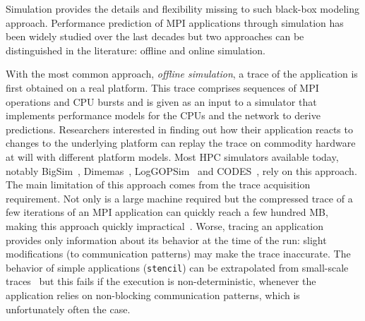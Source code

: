        Simulation provides the details and flexibility missing to such black-box modeling approach. Performance
        prediction of MPI applications through simulation has been widely studied over the last decades but two
        approaches can be distinguished in the literature: offline and online simulation.

        With the most common approach, \emph{offline simulation}, a trace of the application is first obtained on a real
        platform. This trace comprises sequences of MPI operations and CPU bursts and is given as an input to a
        simulator that implements performance models for the CPUs and the network to derive predictions. Researchers
        interested in finding out how their application reacts to changes to the underlying platform can replay the
        trace on commodity hardware at will with different platform models.  Most HPC simulators available today,
        notably BigSim~\cite{bigsim_04}, Dimemas~\cite{dimemas}, LogGOPSim~\cite{loggopsim_10} and CODES~\cite{CODES},
        rely on this approach.  The main limitation of this approach comes from the trace acquisition requirement. Not
        only is a large machine required but the compressed trace of a few iterations of an MPI application can quickly
        reach a few hundred MB, making this approach quickly impractical~\cite{suter}.  Worse, tracing an application
        provides only information about its behavior at the time of the run: slight modifications (\eg to communication
        patterns) may make the trace inaccurate. The behavior of simple applications (\eg \texttt{stencil}) can be
        extrapolated from small-scale traces~\cite{scalaextrap,pmac_lspp13} but this fails if the execution is
        non-deterministic, \eg whenever the application relies on non-blocking communication patterns, which is
        unfortunately often the case.

